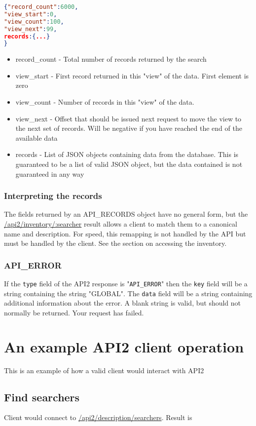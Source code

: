 \documentclass[11pt]{article}
\begin{document}
\begin{lstlisting}[language=json,firstnumber=1]
{"record_count":6000,
"view_start":0,
"view_count":100,
"view_next":99,
records:{...}
}
\end{lstlisting}
\begin{itemize}
\item record\_count - Total number of records returned by the search
\item view\_start - First record returned in this "view" of the data. First element is zero
\item view\_count - Number of records in this "view" of the data.
\item view\_next - Offset that should be issued next request to move the view to the next set of records. Will be negative if you have reached the end of the available data
\item records - List of JSON objects containing data from the database. This is guaranteed to be a list of valid JSON object, but the data contained is not guaranteed in any way
\end{itemize}

\subsubsection{Interpreting the records}
The fields returned by an API\_RECORDS object have no general form, but the \url{/api2/inventory/:searcher} result allows a client to match them to a canonical name and description. For speed, this remapping is not handled by the API but must be handled by the client. See the section on accessing the inventory.

\subsubsection{API\_ERROR}
If the \texttt{type} field of the API2 response is "\texttt{API\_ERROR}" then the \texttt{key} field will be a string containing the string "GLOBAL". The \texttt{data} field will be a string containing additional information about the error. A blank string is valid, but should not normally be returned. Your request has failed.

\section{An example API2 client operation}
This is an example of how a valid client would interact with API2

\subsection{Find searchers}
Client would connect to \url{/api2/description/searchers}. Result is
\end{document}
